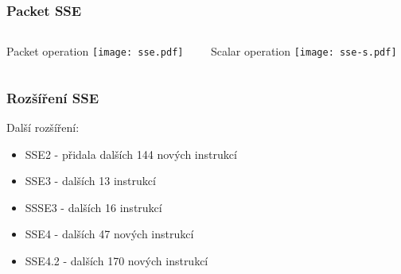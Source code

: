 \documentclass{beamer}
\begin{document}
\begin{frame}
\frametitle{Packet SSE}
\begin{columns}[t,onlytextwidth]
\begin{column}{0.5\textwidth}
\begin{center}
Packet operation
\texttt{[image: sse.pdf]}
\end{center}
\end{column}
\begin{column}{0.5\textwidth}
\begin{center}
Scalar operation
\texttt{[image: sse-s.pdf]}
\end{center}
\end{column}
\end{columns}
\end{frame}

\begin{frame}
\frametitle{Rozšíření SSE}
Další rozšíření:
\begin{itemize}
\item SSE2 - přidala dalších 144 nových instrukcí
\item SSE3 - dalších 13 instrukcí
\item SSSE3 - dalších 16 instrukcí
\item SSE4 - dalších 47 nových instrukcí
\item SSE4.2 - dalších 170 nových instrukcí
\end{itemize}
\end{frame}
\end{document}
